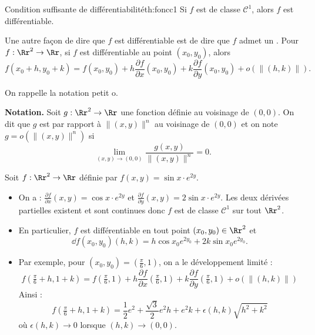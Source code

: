 \begin{theoreme}{Condition suffisante de différentiabilité}{th:foncc1}
	Si $f$ est de classe $\mathcal{C}^1$, alors $f$ est différentiable.
\end{theoreme}

Une autre façon de dire que $f$ est différentiable est de dire que $f$ admet un . Pour $f : \Rr^2 \to \Rr$, si $f$ est différentiable au point $(x_0,y_0)$, alors
$$f(x_0+h,y_0+k)=f(x_0,y_0)+h\frac{\partial f}{\partial x}(x_0,y_0)+k\frac{\partial f}{\partial y}(x_0,y_0)+o\left(\|(h,k)\|\right).$$

\bigskip

On rappelle la notation \og{}petit o\fg{}.

\textbf{Notation.} Soit $g :\Rr^2\to \Rr$ une fonction définie au voisinage de $(0,0)$. On dit que $g$ est  par rapport à $\|(x,y)\|^n$ au voisinage de $(0,0)$ et on note $g=o\left(\|(x,y)\|^n\right)$ si 
$$\lim_{(x,y)\to(0,0)}\frac{g(x,y)}{\|(x,y)\|^n}=0.$$

\begin{exemple}{}{}
	Soit $f : \Rr^2 \to \Rr$ définie par $f(x,y)=\sin x \cdot e ^{2y}$.
	
	\begin{itemize}
		\item On a : $\frac{\partial f}{\partial x}(x,y)=\cos x \cdot e ^{2y}$ et $\frac{\partial f}{\partial y}(x,y)=2\sin x \cdot e ^{2y}$. Les deux dérivées partielles existent et sont continues donc $f$ est de classe $\mathcal{C}^1$ sur tout $\Rr^2$. 
		
		\item En particulier, $f$ est différentiable en tout point $(x_0,y_0) \in \Rr^2$ et 
		$$\dd f (x_0,y_0)(h,k) = h\cos x_0 e ^{2y_0}+2k\sin x_0 e ^{2y_0}.$$
		
		\item Par exemple, pour $(x_0,y_0) = (\frac\pi6,1)$, on a le développement limité :
		$$f(\tfrac\pi6+h,1+k) = f(\tfrac\pi6,1) + 
		h\frac{\partial f}{\partial x}(\tfrac\pi6,1)+
		k \frac{\partial f}{\partial y}(\tfrac\pi6,1) + o\left(\|(h,k)\|\right)$$
		Ainsi :
		$$f(\tfrac\pi6+h,1+k) = \frac{1}{2}e^2 + \frac{\sqrt3}{2}e^2h + 
		e^2k + \epsilon(h,k)\sqrt{h^2+k^2}$$
		où $\epsilon(h,k) \to 0$ lorsque $(h,k) \to (0,0)$. 
	\end{itemize}
	
\end{exemple}



